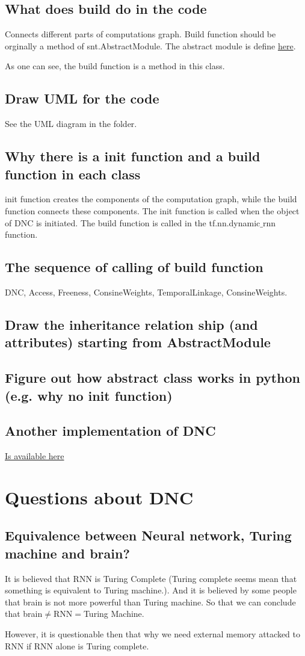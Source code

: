\documentclass{article}
\begin{document}
\subsection{What does build do in the code}
Connects different parts of computations graph. Build function should be orginally a method of snt.AbstractModule. The abstract module is define 
\href{https://github.com/deepmind/sonnet/blob/master/sonnet/python/modules/base.py}{here}.

As one can see, the build function is a method in this class.
\subsection{Draw UML for the code}
See the UML diagram in the folder.
\subsection{Why there is a init function and a build function in each class}
init function creates the components of the computation graph, while the build function connects these components. The init function is called when the object of DNC is initiated. The build function is called in the tf.nn.dynamic$\_$rnn function.
\subsection{The sequence of calling of build function}
DNC, Access, Freeness, ConsineWeights, TemporalLinkage, ConsineWeights.
\subsection{Draw the inheritance relation ship (and attributes) starting from AbstractModule}
\subsection{Figure out how abstract class works in python (e.g. why no init function)}

\subsection{Another implementation of DNC}
\href{https://github.com/Mostafa-Samir/DNC-tensorflow/blob/master/dnc/dnc.py}{Is available here}

\section{Questions about DNC}
\subsection{Equivalence between Neural network, Turing machine and brain?}
It is believed that RNN is Turing Complete (Turing complete seems mean that something is equivalent to Turing machine.). And it is believed by some people that brain is not more powerful than Turing machine. So that we can conclude that brain$\neq$RNN$=$Turing Machine.

However, it is questionable then that why we need external memory attacked to RNN if RNN alone is Turing complete.
\end{document}
